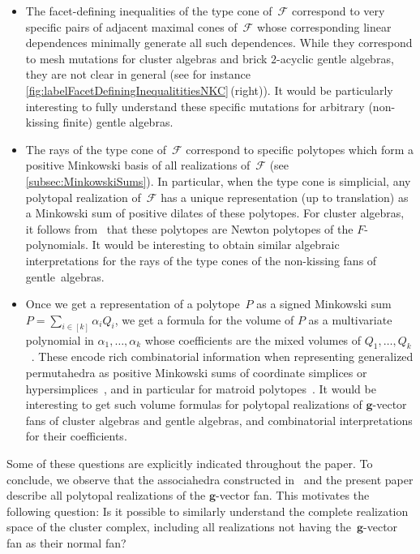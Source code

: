 \documentclass{amsart}
\theoremstyle{definition}
\renewcommand{\b}[1]{{\boldsymbol{#1}}} %
\newcommand{\vincent}[1]{\todo[color=blue!30]{#1 \\ \hfill --- V.}}
\newcommand{\pg}[1]{\todo[color=green!30]{#1 \\ \hfill --- PG.}}
\newcommand{\Fan}{\mathcal{F}} %
\begin{document}
\smallskip
\begin{itemize}
\item The facet-defining inequalities of the type cone of~$\Fan$ correspond to very specific pairs of adjacent maximal cones of~$\Fan$ whose corresponding linear dependences minimally generate all such dependences. While they correspond to mesh mutations for cluster algebras and brick $2$-acyclic gentle algebras, they are not clear in general (see for instance \cref{fig:labelFacetDefiningInequalititiesNKC}\,(right)). It would be particularly interesting to fully understand these specific mutations for arbitrary (non-kissing finite) gentle algebras.

\smallskip
\item The rays of the type cone of~$\Fan$ correspond to specific polytopes which form a positive Minkowski basis of all realizations of~$\Fan$ (see \cref{subsec:MinkowskiSums}). In particular, when the type cone is simplicial, any polytopal realization of~$\Fan$ has a unique representation (up to translation) as a Minkowski sum of positive dilates of these polytopes. For cluster algebras, it follows from~\cite[Sect.~6]{BazierMatteDouvilleMousavandThomasYildirim} that these polytopes are Newton polytopes of the $F$-polynomials. It would be interesting to obtain similar algebraic interpretations for the rays of the type cones of the non-kissing fans of gentle~algebras.

\smallskip
\item Once we get a representation of a polytope~$P$ as a signed Minkowski sum~$P = \sum_{i \in [k]}\alpha_i Q_i$, we get a formula for the volume of $P$ as a multivariate polynomial in $\alpha_1,\dots,\alpha_k$ whose coefficients are the mixed volumes of $Q_1,\dots, Q_k$~\cite{ArdilaBenedettiDoker,McMullen-Valuations}. These encode rich combinatorial information when representing generalized permutahedra as positive Minkowski sums of coordinate simplices or hypersimplices~\cite{Postnikov}, and in particular for matroid polytopes~\cite{ArdilaBenedettiDoker}. It would be interesting to get such volume formulas for polytopal realizations of $\b{g}$-vector fans of cluster algebras and gentle algebras, and combinatorial interpretations for their coefficients.
\end{itemize}

\smallskip
\noindent
Some of these questions are explicitly indicated throughout the paper.
To conclude, we observe that the associahedra constructed in~\cite{ArkaniHamedBaiHeYan, BazierMatteDouvilleMousavandThomasYildirim} and the present paper describe all polytopal realizations of the $\b{g}$-vector fan.
This motivates the following question: Is it possible to similarly understand the complete realization space of the cluster complex, including all realizations not having the~$\b{g}$-vector fan as their normal fan?
\pg{AWESOME introduction.}
\vincent{:-)}
\end{document}
